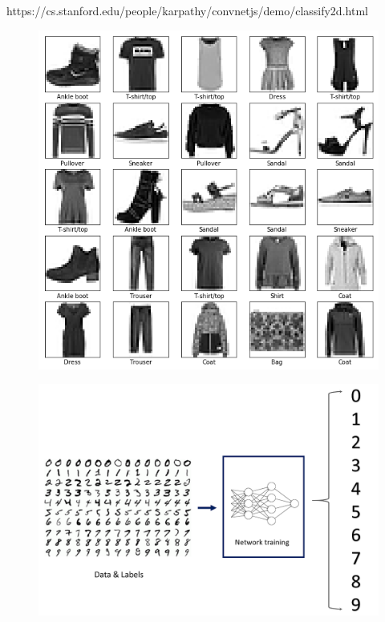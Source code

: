 \documentclass[10pt, compress]{beamer}
\begin{document}
\begin{frame}
  https://cs.stanford.edu/people/karpathy/convnetjs/demo/classify2d.html \\
\end{frame}

\begin{frame}
  \vspace{.5cm}
  \begin{figure}
    \includegraphics[width=0.8\linewidth]{imgs/fashion_mnist}
  \end{figure}
\end{frame}

\begin{frame}
  \vspace{.5cm}
  \begin{figure}
    \includegraphics[width=1\linewidth]{imgs/mnist_1}
  \end{figure}
\end{frame}
\end{document}
